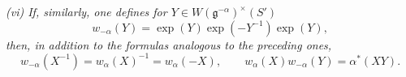 \smallskip
\noindent\emph{\textup{(vi)} If, similarly, one defines for
\(Y\in W(\mathfrak g^{-\alpha})^\times(S')\)}
\[
  w_{-\alpha}(Y)
    =\exp(Y)\exp(-Y^{-1})\exp(Y),
\]
\emph{then, in addition to the formulas analogous to the preceding
ones,}
\[
  w_{-\alpha}(X^{-1})
    =w_\alpha(X)^{-1}
    =w_\alpha(-X),
\qquad
  w_\alpha(X)w_{-\alpha}(Y)=\alpha^\ast(XY).
\]
